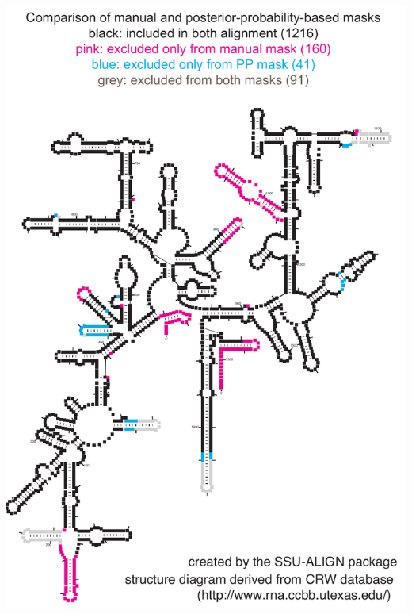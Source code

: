 \documentclass[landscape]{slides}
\begin{document}
\begin{slide}
\begin{center}
\includegraphics[height=8in]{figs/archaea-mask-ph-v-pp-diff}
\end{center}
\vfill
\end{slide}
\end{document}
